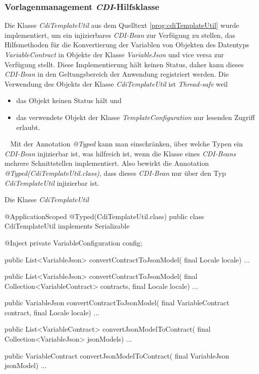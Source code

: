 \subsubsection{Vorlagenmanagement \emph{CDI}-Hilfsklasse}
Die Klasse \emph{CdiTemplateUtil} aus dem Quelltext \ref{prog:cdiTemplateUtil} wurde implementiert, um ein injizierbares \emph{CDI-Bean} zur Verfügung zu stellen, das Hilfsmethoden für die Konvertierung der Variablen von Objekten des Datentyps \emph{VariableContract} in Objekte der Klasse \emph{VariableJson} und vice versa zur Verfügung stellt. Diese Implementierung hält keinen Status, daher kann dieses \emph{CDI-Bean} in den Geltungsbereich der Anwendung registriert werden. Die Verwendung des Objekts der Klasse \emph{CdiTemplateUtil} ist \emph{Thread-safe} weil
\begin{itemize}
	\item das Objekt keinen Status hält und
	\item das verwendete Objekt der Klasse \emph{TemplateConfiguration} nur lesenden Zugriff erlaubt.
\end{itemize}
\ \newline
Mit der Annotation \emph{@Typed} kann man einschränken, über welche Typen ein \emph{CDI-Bean} injizierbar ist, was hilfreich ist, wenn die Klasse eines \emph{CDI-Beans} mehrere Schnittstellen implementiert. Also bewirkt die Annotation \emph{@Typed(CdiTemplateUtil.class)}, dass dieses \emph{CDI-Bean} nur über den Typ \emph{CdiTemplateUtil} injizierbar ist. 

\begin{program}[h]
\caption{Die Klasse \emph{CdiTemplateUtil}}
\label{prog:cdiTemplateUtil}
\begin{JavaCode}
@ApplicationScoped
@Typed(CdiTemplateUtil.class)
public class CdiTemplateUtil implements Serializable {

    @Inject
    private VariableConfiguration config;

    public List<VariableJson> convertContractToJsonModel(
                                     final Locale locale) { ... }

    public List<VariableJson> convertContractToJsonModel(
            final Collection<VariableContract> contracts,
            final Locale locale) { ... }

    public VariableJson convertContractToJsonModel(
                    final VariableContract contract,
                    final Locale locale) { ... }
	
    public List<VariableContract> convertJsonModelToContract(
                   final Collection<VariableJson> jsonModels) { ... }

    public VariableContract convertJsonModelToContract(
                          final VariableJson jsonModel) { ... }

}
\end{JavaCode}
\end{program}

